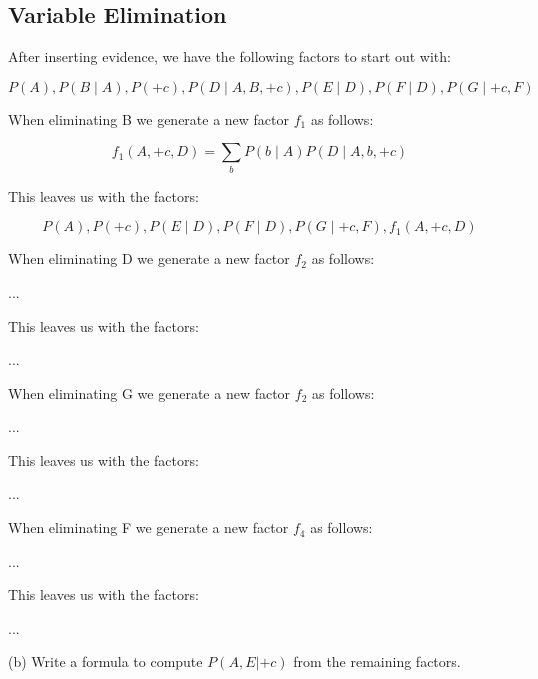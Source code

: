 \documentclass[11pt, answers]{exam}
\begin{document}
\begin{questions}
\section{Variable Elimination}
\question


After inserting evidence, we have the following factors to start out with:


	\begin{solution}
    $$P(A), P(B \mid A), P(+c), P(D \mid A, B,+c), P(E \mid D), P(F \mid D), P(G \mid+c, F)$$
	\end{solution}

When eliminating B we generate a new factor $f_1$ as follows:
	\begin{solution}
	$$f_{1}(A,+c, D)=\sum_{b} P(b \mid A) P(D \mid A, b,+c)$$
	\end{solution}
	
This leaves us with the factors:
	\begin{solution}
	$$P(A), P(+c), P(E \mid D), P(F \mid D), P(G \mid+c, F), f_{1}(A,+c, D)$$
	\end{solution}
	
When eliminating D we generate a new factor $f_2$ as follows:
	\begin{solution}
	...
	\end{solution}
	
\newpage
This leaves us with the factors:
	\begin{solution}
	...
	\end{solution}
	
When eliminating G we generate a new factor $f_2$ as follows:
	\begin{solution}
	...
	\end{solution}

This leaves us with the factors:

	\begin{solution}
	...
	\end{solution}
	
When eliminating F we generate a new factor $f_4$ as follows:

	\begin{solution}
	...
	\end{solution}
	
This leaves us with the factors:
	\begin{solution}
	...
	\end{solution}
	
(b) Write a formula to compute $P(A,E|+c)$ from the remaining factors.


\end{questions}
\end{document}
